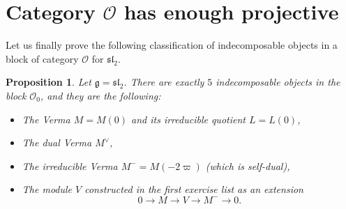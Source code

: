 \documentclass[12pt]{article}
\theoremstyle{plain}
\newtheorem{prop}[thm]{Proposition}
\theoremstyle{definition}
\numberwithin{equation}{section}
\newcommand{\g}{\mathfrak{g}}
\newcommand{\sll}{\mathfrak{sl}}
\newcommand{\OO}{\mathcal{O}}
\begin{document}
\section{Category $\OO$ has enough projective}


Let us finally prove the following classification of indecomposable objects in a block of category $\OO$ for $\sll_2$.
\begin{prop}
Let $\g = \sll_2$. There are exactly $5$ indecomposable objects in the block $\OO_0$, and they are the following:
\begin{itemize}
\item The Verma $M = M(0)$ and its irreducible quotient $L = L(0)$,

\item The dual Verma $M^\vee$,

\item The irreducible Verma $M^- = M(-2\varpi)$ (which is self-dual),

\item The module $V$ constructed in the first exercise list as an extension
\[
0 \rightarrow M \rightarrow V \rightarrow M^- \rightarrow 0.
\]
\end{itemize}
\end{prop}
\end{document}
